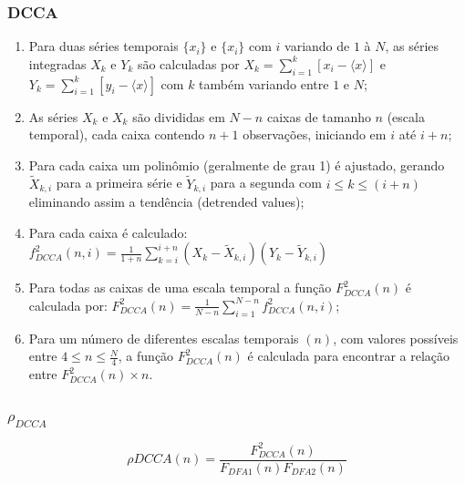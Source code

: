 \documentclass[10pt]{beamer}
\newcommand{\pdcca}{\({\rho}_{DCCA}\) }
\begin{document}
\begin{frame}
  \frametitle{DCCA}
  \begin{enumerate}
    \label{list:dcca}
    \item Para duas séries temporais \(\{x_{i}\}\) e \(\{x_{i}\}\) com  \(i\) variando de  \(1\) à \(N\), as séries integradas \(X_{k}\) e \(Y_{k}\) são calculadas por \(X_{k} = \sum_{i=1}^{k}\left[x_{i} - \langle x \rangle \right] \) e \(Y_{k} = \sum_{i=1}^{k}\left[y_{i} - \langle x \rangle \right] \) com \(k\) também variando entre \(1\) e \(N\);
    \item As séries  \(X_{k}\) e \(X_{k}\) são divididas em \(N - n\) caixas de tamanho \(n\) (escala temporal), cada caixa contendo \(n + 1\) observações, iniciando em \(i\) até \(i + n\);
    \item Para cada caixa um polinômio (geralmente de grau 1) é ajustado, gerando \(\widetilde{X}_{k, i}\) para a primeira série e \(\widetilde{Y}_{k, i}\) para a segunda com \( i \le k \le (i + n) \) eliminando assim a tendência (detrended values);
    \item  Para cada caixa é calculado: $f_{DCCA}^{2}(n, i) = \frac{1}{1+n} \sum_{k=i}^{i + n}(X_{k}-\widetilde{X}_{k, i})(Y_{k}-\widetilde{Y}_{k, i})$
    \item Para todas as caixas de uma escala temporal a função $F_{DCCA}^{2}(n)$ é calculada por: $F_{DCCA}^{2}(n) = \frac{1}{N-n} \sum_{i=1}^{N-n} f_{DCCA}^{2}(n, i)$;
    \item Para um número de diferentes escalas temporais $(n)$, com valores possíveis entre \( 4 \le n \le \frac{N}{4}\), a função $F_{DCCA}^{2}(n)$ é calculada para encontrar a relação entre $F_{DCCA}^{2}(n) \times n$.
  \end{enumerate}



 
\end{frame}

\begin{frame}
  \frametitle{\pdcca}

  \begin{equation}
    \label{eq_pdcca}
    \rho DCCA(n) = \frac{F_{DCCA}^2 (n)}{ F_{DFA1} (n) F_{DFA2} (n)}
  \end{equation}

\end{frame}
\end{document}
